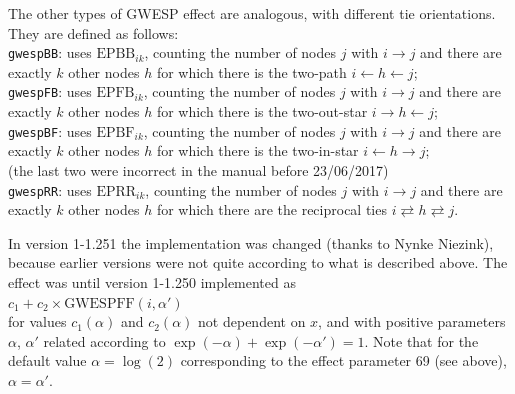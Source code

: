 \documentclass[a4paper,fleqn,11pt]{article}
\newcommand{\+}{\, + \,}
\begin{document}
\begin{enumerate}
The other types of GWESP effect are analogous, with
different tie orientations. They are defined as follows:\\
\texttt{gwespBB}: uses $\text{EPBB}_{ik}$, counting the number of nodes $j$
with $i \rightarrow j$ and there are exactly $k$ other
nodes $h$ for which there is the two-path $i \leftarrow h \leftarrow j$;\\
\texttt{gwespFB}: uses $\text{EPFB}_{ik}$, counting the number of nodes $j$
with $i \rightarrow j$ and there are exactly $k$ other
nodes $h$ for which there is the two-out-star $i \rightarrow h \leftarrow j$;\\
\texttt{gwespBF}: uses $\text{EPBF}_{ik}$, counting the number of nodes $j$
with $i \rightarrow j$ and there are exactly $k$ other
nodes $h$ for which there is the two-in-star $i \leftarrow h \rightarrow j$;\\
(the last two were incorrect in the manual before 23/06/2017)\\
\texttt{gwespRR}: uses $\text{EPRR}_{ik}$, counting the number of nodes $j$
with $i \rightarrow j$ and there are exactly $k$ other
nodes $h$ for which there are the reciprocal ties $i \rightleftarrows h \rightleftarrows j$.

In version 1-1.251 the implementation was changed (thanks to Nynke Niezink),
because earlier versions were not quite according to what is described above.
The effect was until version 1-1.250 implemented as\\
$c_1 + c_2 \times \text{GWESPFF}(i, \alpha')$\\
for values $c_1(\alpha)$ and $c_2(\alpha)$ not dependent on $x$, and with
positive parameters $\alpha$, $\alpha'$ related according to
$\exp(-\alpha) + \exp(-\alpha') = 1$. Note that for the default value
$\alpha = \log(2)$ corresponding to the effect parameter 69 (see above), $\alpha = \alpha'$.


\end{enumerate}
\end{document}

